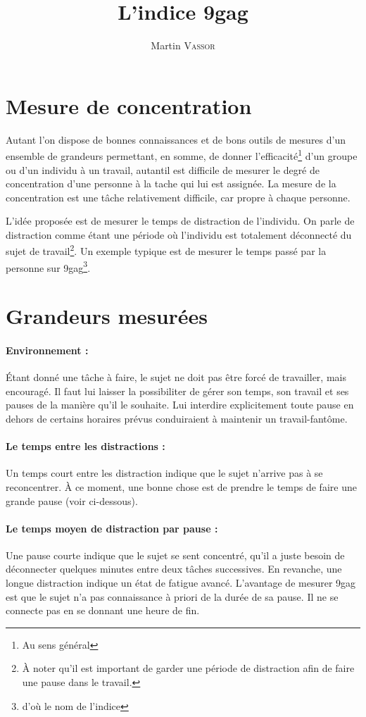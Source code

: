 \documentclass{article}
\title{L'indice 9gag}
\author{Martin \textsc{Vassor}}
\begin{document}
\maketitle
\section{Mesure de concentration}
Autant l'on dispose de bonnes connaissances et de bons outils de mesures d'un ensemble de grandeurs permettant, en somme, de donner l'efficacité\footnote{Au sens général} d'un groupe ou d'un individu à un travail, autantil est difficile de mesurer le degré de concentration d'une personne à la tache qui lui est assignée. La mesure de la concentration est une tâche relativement difficile, car propre à chaque personne.

L'idée proposée est de mesurer le temps de distraction de l'individu. On parle de distraction comme étant une période où l'individu est totalement déconnecté du sujet de travail\footnote{À noter qu'il est important de garder une période de distraction afin de faire une pause dans le travail.}. Un exemple typique est de mesurer le temps passé par la personne sur 9gag\footnote{d'où le nom de l'indice}.
\section{Grandeurs mesurées}
\paragraph{Environnement : }
Étant donné une tâche à faire, le sujet ne doit pas être forcé de travailler, mais encouragé. Il faut lui laisser la possibiliter de gérer son temps, son travail et ses pauses de la manière qu'il le souhaite. Lui interdire explicitement toute pause en dehors de certains horaires prévus conduiraient à maintenir un travail-fantôme.
\paragraph{Le temps entre les distractions : }
Un temps court entre les distraction indique que le sujet n'arrive pas à se reconcentrer. À ce moment, une bonne chose est de prendre le temps de faire une grande pause (voir ci-dessous).
\paragraph{Le temps moyen de distraction par pause : }
Une pause courte indique que le sujet se sent concentré, qu'il a juste besoin de déconnecter quelques minutes entre deux tâches successives. En revanche, une longue distraction indique un état de fatigue avancé. L'avantage de mesurer 9gag est que le sujet n'a pas connaissance à priori de la durée de sa pause. Il ne se connecte pas en se donnant une heure de fin. 
\end{document}
